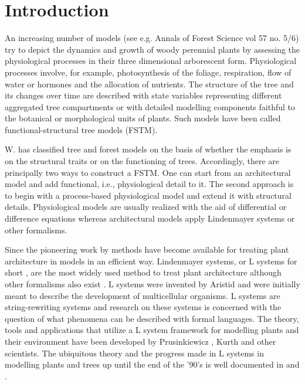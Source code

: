 \section{Introduction} 

An increasing number of models  (see e.g. Annals of Forest Science vol
57 no.  5/6) try to depict  the dynamics and growth of woody perennial
plants  by  assessing  the  physiological  processes  in  their  three
dimensional  arborescent form.   Physiological processes  involve, for
example, photosynthesis of the  foliage, respiration, flow of water or
hormones and the  allocation of nutrients.  The structure  of the tree
and  its  changes  over   time  are  described  with  state  variables
representing different  aggregated tree compartments  or with detailed
modelling components faithful to  the botanical or morphological units
of plants.   Such models  have been called  functional-structural tree
models (FSTM).

W.  \citet{kurth:94b}  has  classified tree and  forest  models on the
basis of whether  the emphasis is on  the structural traits or  on the
functioning of trees.  Accordingly, there  are principally two ways to
construct  a  FSTM.     One can start   from   an  architectural model
\citep{jaeger:92,  kurth:94} and  add  functional, i.e., physiological
detail to it.  The second  approach is to  begin with a  process-based
physiological model \citep{makela:86, landsberg:86, sievanen:93}   and
extend it with   structural details. Physiological models  are usually
realized with  the  aid of    differential  or difference    equations
\citep{landsberg:86} whereas  architectural  models  apply Lindenmayer
systems \citep{kurth:99,pp:90} or other formalisms.

Since  the pioneering  work  by \citet{honda:71}  methods have  become
available for  treating plant architecture  in models in  an efficient
way.  Lindenmayer  systems, or L systems for  short \citep{pp:89}, are
the most widely used method to treat plant architecture although other
formalisms   also  exist  \citep[e.g.][]{dereffye:97,   godin:99}.   L
systems    were    invented    by    Aristid    \citet{lindenmayer:68,
  lindenmayer:71} and were initially meant to describe the development
of  multicellular organisms.  L  systems are  string-rewriting systems
and research on  these systems is concerned with  the question of what
phenomena can  be described with formal languages.   The theory, tools
and  applications that  utilize  a L  system  framework for  modelling
plants  and their  environment  have been  developed by  Prusinkiewicz
\citep{pp:89,pp:92}, Kurth \citep{kurth:94} and other scientists.  The
ubiquitous  theory and  the progress  made in  L systems  in modelling
plants and trees  up until the end of the '90's  is well documented in
\citet{pp:90,pp:99} and \citet{kurth:99}.


